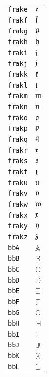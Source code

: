 \begin{longtable}{ll}
\texttt{frake}&${}{\mathfrak{e}} {}$\\
\texttt{frakf}&${}{\mathfrak{f}} {}$\\
\texttt{frakg}&${}{\mathfrak{g}} {}$\\
\texttt{frakh}&${}{\mathfrak{h}} {}$\\
\texttt{fraki}&${}{\mathfrak{i}} {}$\\
\texttt{frakj}&${}{\mathfrak{j}} {}$\\
\texttt{frakk}&${}{\mathfrak{k}} {}$\\
\texttt{frakl}&${}{\mathfrak{l}} {}$\\
\texttt{frakm}&${}{\mathfrak{m}} {}$\\
\texttt{frakn}&${}{\mathfrak{n}} {}$\\
\texttt{frako}&${}{\mathfrak{o}} {}$\\
\texttt{frakp}&${}{\mathfrak{p}} {}$\\
\texttt{frakq}&${}{\mathfrak{q}} {}$\\
\texttt{frakr}&${}{\mathfrak{r}} {}$\\
\texttt{fraks}&${}{\mathfrak{s}} {}$\\
\texttt{frakt}&${}{\mathfrak{t}} {}$\\
\texttt{fraku}&${}{\mathfrak{u}} {}$\\
\texttt{frakv}&${}{\mathfrak{v}} {}$\\
\texttt{frakw}&${}{\mathfrak{w}} {}$\\
\texttt{frakx}&${}{\mathfrak{x}} {}$\\
\texttt{fraky}&${}{\mathfrak{y}} {}$\\
\texttt{frakz}&${}{\mathfrak{z}} {}$\\
\texttt{bbA}&${}{\mathbb{A}}{}$\\
\texttt{bbB}&${}{\mathbb{B}}{}$\\
\texttt{bbC}&${}{\mathbb{C}}{}$\\
\texttt{bbD}&${}{\mathbb{D}}{}$\\
\texttt{bbE}&${}{\mathbb{E}}{}$\\
\texttt{bbF}&${}{\mathbb{F}}{}$\\
\texttt{bbG}&${}{\mathbb{G}}{}$\\
\texttt{bbH}&${}{\mathbb{H}}{}$\\
\texttt{bbI}&${}{\mathbb{I}}{}$\\
\texttt{bbJ}&${}{\mathbb{J}}{}$\\
\texttt{bbK}&${}{\mathbb{K}}{}$\\
\texttt{bbL}&${}{\mathbb{L}}{}$\\

\end{longtable}
